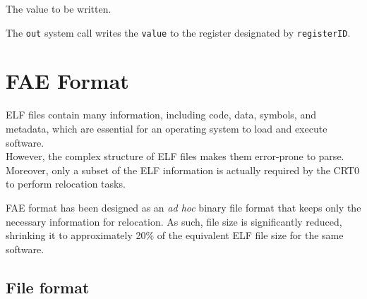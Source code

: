 \documentclass[10pt,a4paper,titlepage]{refart}
\begin{document}
The value to be written.

\medskip
The \texttt{out} system call writes the \texttt{value} to the register designated by \texttt{registerID}.

\pagebreak
\section{FAE Format}

ELF files contain many information, including code, data, symbols, and metadata, which are essential for an operating system to load and
execute software.\\
However, the complex structure of ELF files makes them error-prone to parse.
Moreover, only a subset of the ELF information is actually required by the CRT0 to perform relocation tasks.

FAE format has been designed as an \textit{ad hoc} binary file format that keeps only the necessary information for relocation.
As such, file size is significantly reduced, shrinking it to approximately 20\% of the equivalent ELF file size for the same software.

\subsection{File format}
\end{document}
